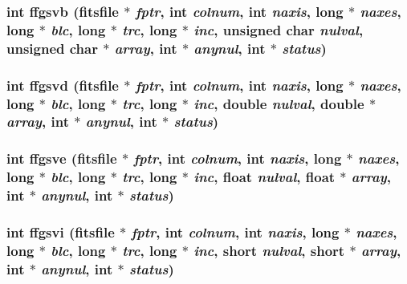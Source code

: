 \subsubsection{\setlength{\rightskip}{0pt plus 5cm}int ffgsvb (\bf{fitsfile} $\ast$ {\em fptr}, int {\em colnum}, int {\em naxis}, long $\ast$ {\em naxes}, long $\ast$ {\em blc}, long $\ast$ {\em trc}, long $\ast$ {\em inc}, unsigned char {\em nulval}, unsigned char $\ast$ {\em array}, int $\ast$ {\em anynul}, int $\ast$ {\em status})}\label{test_2shm__client_2fitsio_8h_83da0d68b492ed457e64f01e1dfad807}


\subsubsection{\setlength{\rightskip}{0pt plus 5cm}int ffgsvd (\bf{fitsfile} $\ast$ {\em fptr}, int {\em colnum}, int {\em naxis}, long $\ast$ {\em naxes}, long $\ast$ {\em blc}, long $\ast$ {\em trc}, long $\ast$ {\em inc}, double {\em nulval}, double $\ast$ {\em array}, int $\ast$ {\em anynul}, int $\ast$ {\em status})}\label{test_2shm__client_2fitsio_8h_d7a1005a5c7e8f1f436eac3d8e5d837d}


\subsubsection{\setlength{\rightskip}{0pt plus 5cm}int ffgsve (\bf{fitsfile} $\ast$ {\em fptr}, int {\em colnum}, int {\em naxis}, long $\ast$ {\em naxes}, long $\ast$ {\em blc}, long $\ast$ {\em trc}, long $\ast$ {\em inc}, float {\em nulval}, float $\ast$ {\em array}, int $\ast$ {\em anynul}, int $\ast$ {\em status})}\label{test_2shm__client_2fitsio_8h_caea21eb62f053c04e29d9fe6706e7ee}


\subsubsection{\setlength{\rightskip}{0pt plus 5cm}int ffgsvi (\bf{fitsfile} $\ast$ {\em fptr}, int {\em colnum}, int {\em naxis}, long $\ast$ {\em naxes}, long $\ast$ {\em blc}, long $\ast$ {\em trc}, long $\ast$ {\em inc}, short {\em nulval}, short $\ast$ {\em array}, int $\ast$ {\em anynul}, int $\ast$ {\em status})}\label{test_2shm__client_2fitsio_8h_f6fc8403f2e424f4940ccbb2ef1f13c5}



